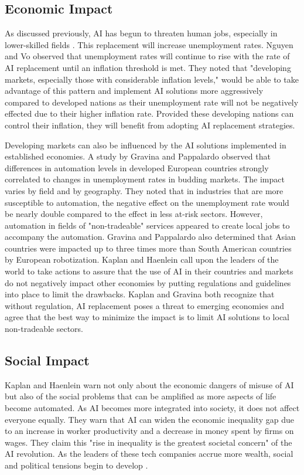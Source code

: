 \documentclass[12pt, man]{apa6}
\begin{document}
\subsection*{Economic Impact}
As discussed previously, AI has begun to threaten human jobs, especially in lower-skilled fields \parencite{Huang2018}.  This replacement will increase unemployment rates.  Nguyen and Vo \parencite*{Nguyen2022} observed that unemployment rates will continue to rise with the rate of AI replacement until an inflation threshold is met.  They noted that "developing markets, especially those with considerable inflation levels," would be able to take advantage of this pattern and implement AI solutions more aggressively compared to developed nations as their unemployment rate will not be negatively effected due to their higher inflation rate.  Provided these developing nations can control their inflation, they will benefit from adopting AI replacement strategies.

Developing markets can also be influenced by the AI solutions implemented in established economies.  A study by Gravina and Pappalardo \parencite*{Gravina2022} observed that differences in automation levels in developed European countries strongly correlated to changes in unemployment rates in budding markets.  The impact varies by field and by geography.  They noted that in industries that are more susceptible to automation, the negative effect on the unemployment rate would be nearly double compared to the effect in less at-risk sectors.  However, automation in fields of "non-tradeable" services appeared to create local jobs to accompany the automation. Gravina and Pappalardo also determined that Asian countries were impacted up to three times more than South American countries by European robotization.  Kaplan and Haenlein \parencite*{Kaplan2020} call upon the leaders of the world to take actions to assure that the use of AI in their countries and markets do not negatively impact other economies by putting regulations and guidelines into place to limit the drawbacks.  Kaplan and Gravina both recognize that without regulation, AI replacement poses a threat to emerging economies and agree that the best way to minimize the impact is to limit AI solutions to local non-tradeable sectors.

\subsection*{Social Impact}
Kaplan and Haenlein \parencite*{Kaplan2020} warn not only about the economic dangers of misuse of AI but also of the social problems that can be amplified as more aspects of life become automated.  As AI becomes more integrated into society, it does not affect everyone equally.  They warn that AI can widen the economic inequality gap due to an increase in worker productivity and a decrease in money spent by firms on wages.  They claim this "rise in inequality is the greatest societal concern" of the AI revolution.  As the leaders of these tech companies accrue more wealth, social and political tensions begin to develop \parencite{Arogyaswamy2020}.
\end{document}
